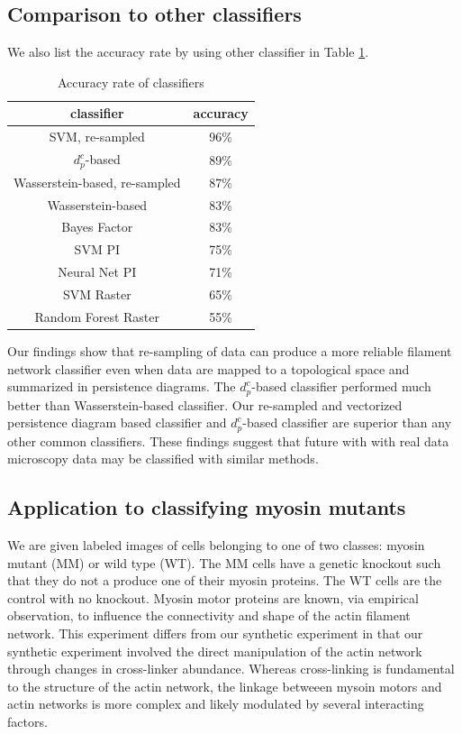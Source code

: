 \documentclass[10pt]{article}
\begin{document}
\subsection{Comparison to other classifiers}
We also list the accuracy rate by using other classifier in Table \ref{tab:accuracyrate}.
\begin{table}[!htb]
	\begin{center}
		\begin{tabular}{c|c}
			\hline
			\textbf{classifier} & \textbf{accuracy} \\
			\hline
			SVM, re-sampled & 96\%  \\
			\hline
			$d^c_p$-based & 89\%  \\
			\hline
			Wasserstein-based, re-sampled & 87\%  \\
			\hline
			Wasserstein-based & 83\%  \\
			\hline
			Bayes Factor \cite{maroulas2019bayesian} & 83\%  \\
			\hline
			SVM PI \cite{adams2017persistence} & 75\%  \\
			\hline
			Neural Net PI & 71\%  \\
			\hline
			SVM Raster & 65\%  \\
			\hline
			Random Forest Raster & 55\%  \\
			\hline
		\end{tabular}
		\caption{Accuracy rate of classifiers}\label{tab:accuracyrate}
	\end{center}
\end{table}

Our findings show that re-sampling of data can produce a more reliable filament network classifier even when data are mapped to a topological space and summarized in persistence diagrams. The $d^c_p$-based classifier performed much better than Wasserstein-based classifier. Our re-sampled and vectorized persistence diagram based classifier and $d^c_p$-based classifier are superior than any other common classifiers. These findings suggest that future with with real data microscopy data may be classified with similar methods.

\subsection{Application to classifying myosin mutants}
We are given labeled images of cells belonging to one of two classes: myosin mutant (MM) or wild type (WT). The MM cells have a genetic knockout such that they do not a produce one of their myosin proteins. The WT cells are the control with no knockout. Myosin motor proteins are known, via empirical observation, to influence the connectivity and shape of the actin filament network. This experiment differs from our synthetic experiment in that our synthetic experiment involved the direct manipulation of the actin network through changes in cross-linker abundance. Whereas cross-linking is fundamental to the structure of the actin network, the linkage betweeen mysoin motors and actin networks is more complex and likely modulated by several interacting factors.
\end{document}

